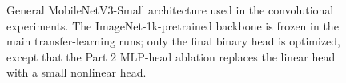 \documentclass[12pt]{article}
\begin{document}
\begin{figure}[t]
  \centering
  \setlength{\tabcolsep}{3pt}
  \renewcommand{\arraystretch}{1.25}
  \scriptsize
  \caption{General MobileNetV3-Small architecture used in the convolutional experiments. The ImageNet-1k-pretrained backbone is frozen in the main transfer-learning runs; only the final binary head is optimized, except that the Part 2 MLP-head ablation replaces the linear head with a small nonlinear head.}
  \label{fig:cnn-flow}
\end{figure}
\end{document}
